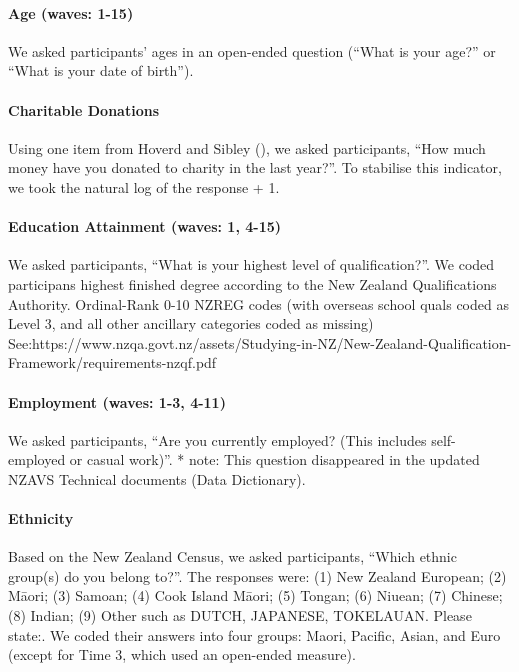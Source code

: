 \documentclass[
  singlecolumn]{article}
\let\oldparagraph\paragraph
\renewcommand{\paragraph}[1]{\oldparagraph{#1}\mbox{}}
\begin{document}
\paragraph{Age (waves: 1-15)}\label{age-waves-1-15}

We asked participants' ages in an open-ended question (``What is your
age?'' or ``What is your date of birth'').

\paragraph{Charitable Donations}\label{charitable-donations}

Using one item from Hoverd and Sibley
(), we asked participants,
``How much money have you donated to charity in the last year?''. To
stabilise this indicator, we took the natural log of the response + 1.

\paragraph{Education Attainment (waves: 1,
4-15)}\label{education-attainment-waves-1-4-15}

We asked participants, ``What is your highest level of qualification?''.
We coded participans highest finished degree according to the New
Zealand Qualifications Authority. Ordinal-Rank 0-10 NZREG codes (with
overseas school quals coded as Level 3, and all other ancillary
categories coded as missing)
See:https://www.nzqa.govt.nz/assets/Studying-in-NZ/New-Zealand-Qualification-Framework/requirements-nzqf.pdf

\paragraph{Employment (waves: 1-3,
4-11)}\label{employment-waves-1-3-4-11}

We asked participants, ``Are you currently employed? (This includes
self-employed or casual work)''. * note: This question disappeared in
the updated NZAVS Technical documents (Data Dictionary).

\paragraph{Ethnicity}\label{ethnicity}

Based on the New Zealand Census, we asked participants, ``Which ethnic
group(s) do you belong to?''. The responses were: (1) New Zealand
European; (2) Māori; (3) Samoan; (4) Cook Island Māori; (5) Tongan; (6)
Niuean; (7) Chinese; (8) Indian; (9) Other such as DUTCH, JAPANESE,
TOKELAUAN. Please state:. We coded their answers into four groups:
Maori, Pacific, Asian, and Euro (except for Time 3, which used an
open-ended measure).
\end{document}
